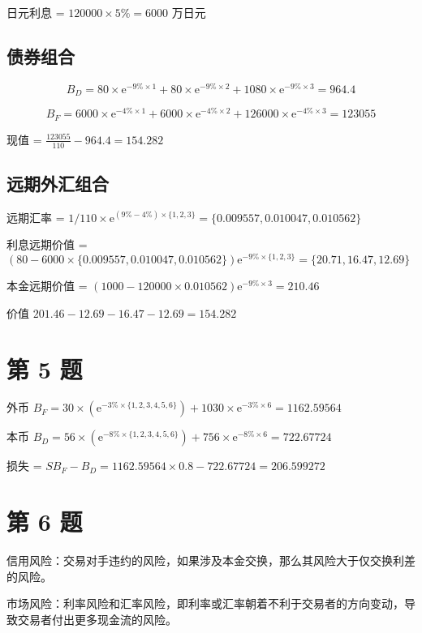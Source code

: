 \documentclass{article}
\begin{document}
日元利息 = $120000\times5\%=6000$ 万日元

\subsection*{债券组合}

\begin{equation}
    B_D = 80\times \mathrm{e}^{-9\%\times1} + 80\times \mathrm{e}^{-9\%\times2} + 1080\times \mathrm{e}^{-9\%\times3} = 964.4
\end{equation}

\begin{equation}
    B_F = 6000\times \mathrm{e}^{-4\%\times1} + 6000\times \mathrm{e}^{-4\%\times2} + 126000\times \mathrm{e}^{-4\%\times3} = 123055
\end{equation}

现值 = $\frac{123055}{110}-964.4=154.282$

\subsection*{远期外汇组合}

远期汇率 = $1/110 \times \mathrm{e}^{(9\%-4\%)\times\{1,2,3\}} = \{0.009557,0.010047,0.010562\}$

利息远期价值 = $(80 - 6000\times\{0.009557,0.010047,0.010562\}) \mathrm{e}^{-9\%\times\{1,2,3\}} = \{20.71,16.47,12.69\}$

本金远期价值 = $(1000 - 120000\times0.010562) \mathrm{e}^{-9\%\times3} = 210.46$

价值 $201.46-12.69-16.47-12.69=154.282$ 

\section*{第 5 题}

外币 $B_F = 30\times(\mathrm{e}^{-3\%\times\{1,2,3,4,5,6\}}) + 1030\times \mathrm{e}^{-3\%\times6} = 1162.59564$ 

本币 $B_D = 56\times(\mathrm{e}^{-8\%\times\{1,2,3,4,5,6\}}) + 756\times \mathrm{e}^{-8\%\times6} = 722.67724$

损失 = $SB_F-B_D = 1162.59564\times0.8-722.67724=206.599272$

\section*{第 6 题}

信用风险：交易对手违约的风险，如果涉及本金交换，那么其风险大于仅交换利差的风险。

市场风险：利率风险和汇率风险，即利率或汇率朝着不利于交易者的方向变动，导致交易者付出更多现金流的风险。
\end{document}
